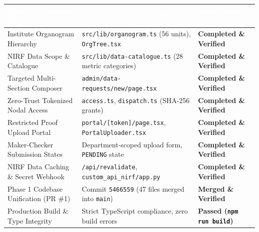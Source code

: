 \documentclass[11pt,a4paper]{article}
\begin{document}
\begin{table}[h]
\centering
\small
\renewcommand{\arraystretch}{1.2}
\begin{tabular}{p{6.2cm} p{6.0cm} p{3.2cm}}
\toprule
\rowcolor{primary}
\textcolor{white}{\textbf{Phase 1 Milestone Deliverable}} & \textcolor{white}{\textbf{Key Artifacts / Code Paths}} & \textcolor{white}{\textbf{Verification Status}} \\
\midrule
Institute Organogram Hierarchy & \texttt{src/lib/organogram.ts} (56 units), \texttt{OrgTree.tsx} & \textcolor{accentgreen}{\textbf{Completed \& Verified}} \\
\rowcolor{lightbg}
NIRF Data Scope \& Catalogue & \texttt{src/lib/data-catalogue.ts} (28 metric categories) & \textcolor{accentgreen}{\textbf{Completed \& Verified}} \\
Targeted Multi-Section Composer & \texttt{admin/data-requests/new/page.tsx} & \textcolor{accentgreen}{\textbf{Completed \& Verified}} \\
\rowcolor{lightbg}
Zero-Trust Tokenized Nodal Access & \texttt{access.ts}, \texttt{dispatch.ts} (SHA-256 grants) & \textcolor{accentgreen}{\textbf{Completed \& Verified}} \\
Restricted Proof Upload Portal & \texttt{portal/[token]/page.tsx}, \texttt{PortalUploader.tsx} & \textcolor{accentgreen}{\textbf{Completed \& Verified}} \\
\rowcolor{lightbg}
Maker-Checker Submission States & Department-scoped upload form, \texttt{PENDING} state & \textcolor{accentgreen}{\textbf{Completed \& Verified}} \\
NIRF Data Caching \& Secret Webhook & \texttt{/api/revalidate}, \texttt{custom\_api\_nirf/app.py} & \textcolor{accentgreen}{\textbf{Completed \& Verified}} \\
\rowcolor{lightbg}
Phase 1 Codebase Unification (PR \#1) & Commit \texttt{5466559} (47 files merged into \texttt{main}) & \textcolor{accentgreen}{\textbf{Merged \& Verified}} \\
Production Build \& Type Integrity & Strict TypeScript compliance, zero build errors & \textcolor{accentgreen}{\textbf{Passed (\texttt{npm run build})}} \\
\bottomrule
\end{tabular}
\end{table}
\end{document}
